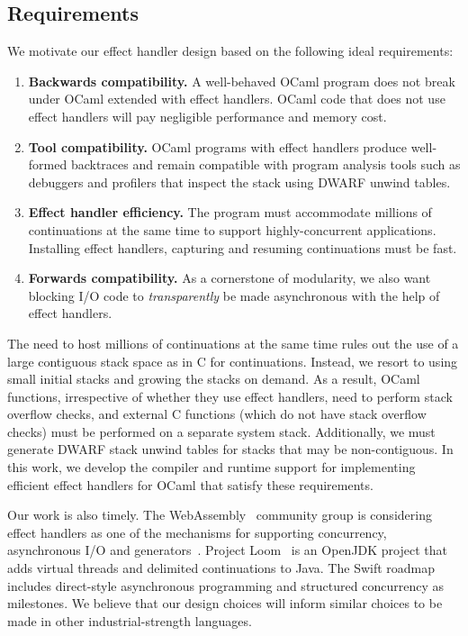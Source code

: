 \documentclass[sigplan,screen]{acmart}
\begin{document}
\subsection{Requirements}
\label{sec:req}

We motivate our effect handler design based on the following ideal
requirements:

\begin{enumerate}[label=R\arabic*]
	\item \textbf{Backwards compatibility.} A well-behaved OCaml program does
		not break under OCaml extended with effect handlers. OCaml code that does
		not use effect handlers will pay negligible performance and memory cost.

	\item \textbf{Tool compatibility.} OCaml programs with effect handlers
		produce well-formed backtraces and remain compatible with program analysis
		tools such as debuggers and profilers that inspect the stack using DWARF
		unwind tables.

	\item \textbf{Effect handler efficiency.} The program must accommodate
		millions of continuations at the same time to support highly-concurrent
		applications. Installing effect handlers, capturing and resuming
		continuations must be fast.

	\item \textbf{Forwards compatibility.} As a cornerstone of modularity, we
		also want blocking I/O code to \emph{transparently} be made asynchronous
		with the help of effect handlers.
\end{enumerate}

The need to host millions of continuations at the same time rules out the use
of a large contiguous stack space as in C for continuations. Instead, we resort
to using small initial stacks and growing the stacks on demand. As a result,
OCaml functions, irrespective of whether they use effect handlers, need to
perform stack overflow checks, and external C functions (which do not have stack
overflow checks) must be performed on a separate system stack. Additionally, we
must generate DWARF stack unwind tables for stacks that may be non-contiguous.
In this work, we develop the compiler and runtime support for implementing
efficient effect handlers for OCaml that satisfy these requirements.

Our work is also timely. The WebAssembly~\cite{Hass17} community group is
considering effect handlers as one of the mechanisms for supporting
concurrency, asynchronous I/O and generators~\cite{WasmProposal}. Project
Loom~\cite{loom} is an OpenJDK project that adds virtual threads and delimited
continuations to Java. The Swift roadmap~\cite{swift} includes direct-style
asynchronous programming and structured concurrency as milestones. We believe
that our design choices will inform similar choices to be made in other
industrial-strength languages.
\end{document}
